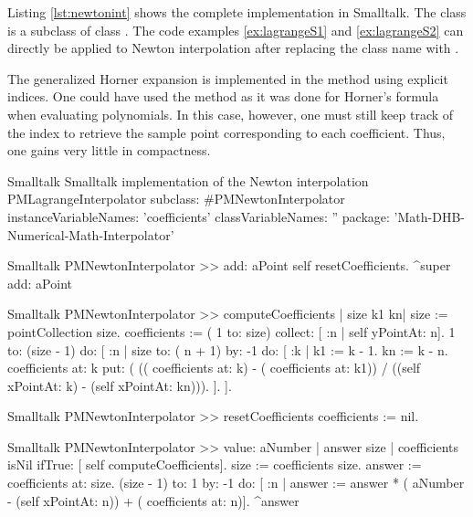 Listing \ref{lst:newtonint} shows the complete implementation in
Smalltalk. The class  is a subclass of
class . The code examples
\ref{ex:lagrangeS1} and \ref{ex:lagrangeS2} can directly be
applied to Newton interpolation after replacing the class name  with .

The generalized Horner expansion is implemented in the method  using explicit indices. One could have used the method  as it was done for Horner's formula when
evaluating polynomials. In this case, however, one must still keep
track of the index to retrieve the sample point corresponding to
each coefficient. Thus, one gains very little in compactness.

\begin{listing}[label=lst:newtonint]{Smalltalk}
{Smalltalk implementation of the Newton interpolation}
PMLagrangeInterpolator subclass: #PMNewtonInterpolator
   instanceVariableNames: 'coefficients'
   classVariableNames: ''
   package: 'Math-DHB-Numerical-Math-Interpolator'
\end{listing}

\begin{displaycode}{Smalltalk}
PMNewtonInterpolator >> add: aPoint
    self resetCoefficients.
    ^super add: aPoint
\end{displaycode}

\begin{displaycode}{Smalltalk}
PMNewtonInterpolator >> computeCoefficients
    | size k1 kn|
    size := pointCollection size.
    coefficients := ( 1 to: size) collect: [ :n | self yPointAt: n].
    1 to: (size - 1)
        do: [ :n |
              size to: ( n + 1)  by: -1
                do: [ :k |
                      k1 := k - 1.
                      kn := k - n.
                      coefficients at: k put: ( (( coefficients at: 
                                         k) - ( coefficients at: k1)) 
                                            / ((self xPointAt: k) - 
                                                (self xPointAt: kn))).
                    ].
            ].
\end{displaycode}

\begin{displaycode}{Smalltalk}
PMNewtonInterpolator >> resetCoefficients
    coefficients := nil.
\end{displaycode}

\begin{displaycode}{Smalltalk}
PMNewtonInterpolator >> value: aNumber
    | answer size |
    coefficients isNil
        ifTrue: [ self computeCoefficients].
    size := coefficients size.
    answer := coefficients at: size.
    (size - 1) to: 1 by: -1
        do: [ :n | answer := answer * ( aNumber - (self xPointAt:  
                                         n)) + ( coefficients at: n)].
    ^answer
\end{displaycode}

